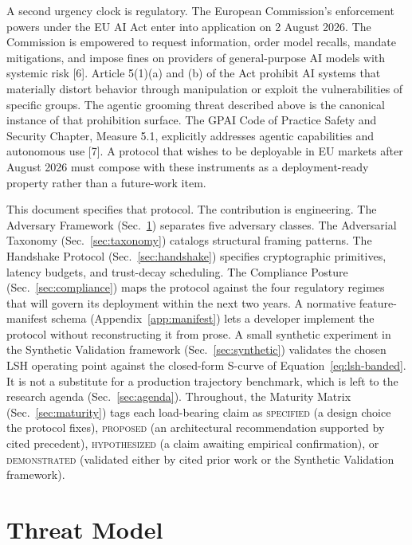 \documentclass[11pt]{article}
\begin{document}
A second urgency clock is regulatory. The European Commission's enforcement powers under the EU AI Act enter into application on 2 August 2026. The Commission is empowered to request information, order model recalls, mandate mitigations, and impose fines on providers of general-purpose AI models with systemic risk [6]. Article 5(1)(a) and (b) of the Act prohibit AI systems that materially distort behavior through manipulation or exploit the vulnerabilities of specific groups. The agentic grooming threat described above is the canonical instance of that prohibition surface. The GPAI Code of Practice Safety and Security Chapter, Measure 5.1, explicitly addresses agentic capabilities and autonomous use [7]. A protocol that wishes to be deployable in EU markets after August 2026 must compose with these instruments as a deployment-ready property rather than a future-work item.

This document specifies that protocol. The contribution is engineering. The Adversary Framework (Sec.~\ref{sec:threat}) separates five adversary classes. The Adversarial Taxonomy (Sec.~\ref{sec:taxonomy}) catalogs structural framing patterns. The Handshake Protocol (Sec.~\ref{sec:handshake}) specifies cryptographic primitives, latency budgets, and trust-decay scheduling. The Compliance Posture (Sec.~\ref{sec:compliance}) maps the protocol against the four regulatory regimes that will govern its deployment within the next two years. A normative feature-manifest schema (Appendix~\ref{app:manifest}) lets a developer implement the protocol without reconstructing it from prose. A small synthetic experiment in the Synthetic Validation framework (Sec.~\ref{sec:synthetic}) validates the chosen LSH operating point against the closed-form S-curve of Equation~\eqref{eq:lsh-banded}. It is not a substitute for a production trajectory benchmark, which is left to the research agenda (Sec.~\ref{sec:agenda}). Throughout, the Maturity Matrix (Sec.~\ref{sec:maturity}) tags each load-bearing claim as \textsc{specified} (a design choice the protocol fixes), \textsc{proposed} (an architectural recommendation supported by cited precedent), \textsc{hypothesized} (a claim awaiting empirical confirmation), or \textsc{demonstrated} (validated either by cited prior work or the Synthetic Validation framework).

\section{Threat Model}
\label{sec:threat}
\end{document}
